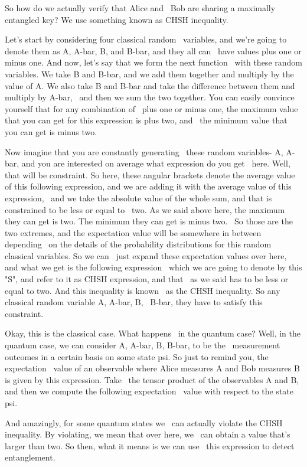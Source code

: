So how do we actually verify that Alice and 
Bob are sharing a maximally entangled key?
We use something known as CHSH inequality.

Let's start by considering four classical random 
variables, and we're going to denote them as A,
A-bar, B, and B-bar, and they all can 
have values plus one or minus one.
And now, let's say that we form the next function 
with these random variables. We take B and B-bar,
and we add them together and multiply by the 
value of A. We also take B and B-bar and take
the difference between them and multiply by A-bar, 
and then we sum the two together. You can easily
convince yourself that for any combination of 
plus one or minus one, the maximum value that
you can get for this expression is plus two, and 
the minimum value that you can get is minus two.

Now imagine that you are constantly generating 
these random variables- A, A-bar, and you are
interested on average what expression do you get 
here. Well, that will be constraint. So here,
these angular brackets denote the average value 
of this following expression, and we are adding
it with the average value of this expression, 
and we take the absolute value of the whole sum,
and that is constrained to be less or equal to 
two. As we said above here, the maximum they can
get is two. The minimum they can get is minus two. 
So those are the two extremes, and the expectation
value will be somewhere in between depending 
on the details of the probability distributions
for this random classical variables. So we can 
just expand these expectation values over here,
and what we get is the following expression 
which we are going to denote by this "S",
and refer to it as CHSH expression, and that 
as we said has to be less or equal to two.
And this inequality is known 
as the CHSH inequality.
So any classical random variable A, A-bar, B, 
B-bar, they have to satisfy this constraint.

Okay, this is the classical case. What happens 
in the quantum case? Well, in the quantum case,
we can consider A, A-bar, B, B-bar, to be the 
measurement outcomes in a certain basis on some
state psi. So just to remind you, the expectation 
value of an observable where Alice measures A and
Bob measures B is given by this expression. Take 
the tensor product of the observables A and B,
and then we compute the following expectation 
value with respect to the state psi.

And amazingly, for some quantum states we 
can actually violate the CHSH inequality.
By violating, we mean that over here, we 
can obtain a value that's larger than two.
So then, what it means is we can use 
this expression to detect entanglement.

